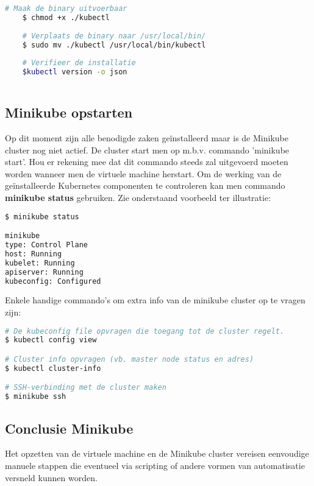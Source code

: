 \begin{enumerate}
\begin{lstlisting}[language=bash]
    # Maak de binary uitvoerbaar
    $ chmod +x ./kubectl
    
    # Verplaats de binary naar /usr/local/bin/
    $ sudo mv ./kubectl /usr/local/bin/kubectl
    
    # Verifieer de installatie
    $kubectl version -o json
    
    \end{lstlisting}
    
\end{enumerate} 

\subsection{Minikube opstarten}

Op dit moment zijn alle benodigde zaken geïnstalleerd maar is de Minikube cluster nog niet actief. De cluster start men op m.b.v. commando 'minikube start'. Hou er rekening mee dat dit commando steeds zal uitgevoerd moeten worden wanneer men de virtuele machine herstart.
Om de werking van de geïnstalleerde Kubernetes componenten te controleren kan men commando {\bf minikube status} gebruiken. Zie onderstaand voorbeeld ter illustratie: 
\begin{lstlisting}[language=bash]
$ minikube status

minikube
type: Control Plane
host: Running
kubelet: Running
apiserver: Running
kubeconfig: Configured
\end{lstlisting} 

Enkele handige commando's om extra info van de minikube cluster op te vragen zijn:
\begin{lstlisting}[language=bash]
# De kubeconfig file opvragen die toegang tot de cluster regelt.
$ kubectl config view 

# Cluster info opvragen (vb. master node status en adres)
$ kubectl cluster-info

# SSH-verbinding met de cluster maken
$ minikube ssh 

\end{lstlisting}

\subsection{Conclusie Minikube}

Het opzetten van de virtuele machine en de Minikube cluster vereisen eenvoudige manuele stappen die eventueel via scripting of andere vormen van automatisatie versneld kunnen worden.

